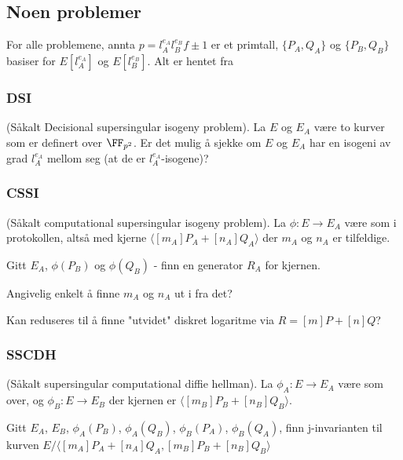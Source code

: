 \subsection{Noen problemer}
For alle problemene, annta $p = l_A^{e_A} l_B^{e_B}f \pm 1$ er et primtall, $\{P_A, Q_A\}$ og $\{P_B, Q_B\}$ basiser for $E[l_A^{e_A}]$ og $E[l_B^{e_B}]$.
Alt er hentet fra \cite{sidh}

\subsubsection{DSI}
(Såkalt Decisional supersingular isogeny problem). La $E$ og $E_A$ være to kurver som er definert over $\FF_{p^2}$. Er det mulig å sjekke om $E$ og $E_A$ har en isogeni av grad $l_A^{e_A}$ mellom seg (at de er $l_A^{e_A}$-isogene)?

\subsubsection{CSSI}
(Såkalt computational supersingular isogeny problem). La $\phi: E \rightarrow E_A$ være som i protokollen, altså med kjerne $\langle [m_A]P_A + [n_A]Q_A \rangle$ der $m_A$ og $n_A$ er tilfeldige. 

Gitt $E_A$, $\phi(P_B)$ og $\phi(Q_B)$ - finn en generator $R_A$ for kjernen. 

Angivelig enkelt å finne $m_A$ og $n_A$ ut i fra det?

Kan reduseres til å finne "utvidet" diskret logaritme via $R = [m]P + [n]Q$?
\subsubsection{SSCDH}
(Såkalt supersingular computational diffie hellman). La $\phi_A: E \rightarrow E_A$ være som over, og $\phi_B: E \rightarrow E_B$ der kjernen er $\langle [m_B] P_B + [n_B] Q_B \rangle$. 

Gitt $E_A$, $E_B$, $\phi_A(P_B)$, $\phi_A(Q_B)$, $\phi_B(P_A)$, $\phi_B(Q_A)$, finn j-invarianten til kurven $E/\langle [m_A]P_A + [n_A] Q_A, [m_B]P_B + [n_B] Q_B \rangle$
